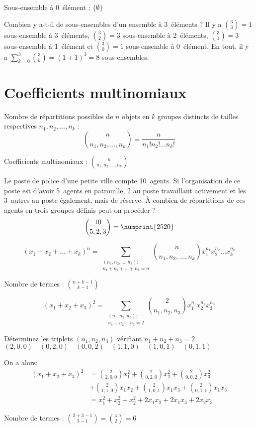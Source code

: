 Sous-ensemble à 0~élément : $\{\emptyset\}$

\noindent Combien y a-t-il de sous-ensembles d’un ensemble à 3~éléments ?
 Il y a $\binom{3}{3}=1$ sous-ensemble à 3~éléments, $\binom{3}{2}=3$ sous-ensemble à 2~éléments, $\binom{3}{1}=3$ sous-ensemble à 1~élément et $\binom{3}{0}=1$ sous-ensemble à 0~élément. En tout, il y a $\sum_{k=0}^{3}\binom{3}{k} = (1+1)^3 = 8$ sous-ensembles.

\section{Coefficients multinomiaux}

Nombre de répartitions possibles de $n$ objets en $k$ groupes distincts de tailles respectives $n_1, n_2,\dots, n_k$ :
\[\binom{n}{n_1,n_2,\dots,n_k} = \frac{n}{n_1!n_2!\dots n_k!}\]

Coefficients multinomiaux : $\binom{n}{n_1,n_2,\dots,n_k}$

 Le poste de police d’une petite ville compte 10~agents. Si l’organisation de ce poste est d’avoir 5~agents en patrouille, 2 au poste travaillant activement et les 3~autres au poste également, mais de réserve. À combien de répartitions de ces agents en trois groupes définis peut-on procéder ?
\[\binom{10}{5,2,3} = \numprint{2520}\]

\[(x_1 + x_2 + \dots + x_k)^n = \sum_{\substack{(n_1,n_2,\dots,n_k):\\n_1+n_2+\dots+n_k=n}} \binom{n}{n_1,n_2,\dots,n_k} x_1^{n_1} x_2^{n_2} \dots x_k^{n_k}\]

Nombre de termes : $\binom{n+k-1}{k-1}$

\[(x_1 + x_2 + x_3)^2 = \sum_{\substack{(n_1,n_2,n_3):\\n_1+n_2+n_3=2}} \binom{2}{n_1,n_2,n_3} x_1^{n_1} x_2^{n_2} x_3^{n_3}\]

\noindent Déterminez les triplets $(n_1, n_2, n_3)$ vérifiant $n_1 + n_2 + n_3 = 2$
$(2,0,0) \quad (0,2,0) \quad (0,0,2) \quad
 (1,1,0) \quad (1,0,1) \quad (0,1,1)$

\noindent On a alors:
\begin{align*}
	(x_1 + x_2 + x_3)^2 & = \binom{2}{2,0,0}x_1^2 + \binom{2}{0,2,0}x_2^2 + \binom{2}{0,0,2}x_3^2       \\
	                    & + \binom{2}{1,1,0}x_1 x_2 + \binom{2}{1,0,1}x_1 x_3 + \binom{2}{0,1,1}x_1 x_3 \\
	                    & = x_1^2 + x_2^2 + x_2^2 + 2 x_1 x_2 + 2 x_1 x_3 + 2 x_2 x_3
\end{align*}

Nombre de termes : $\binom{2+3-1}{3-1} = \binom{4}{2} = 6$
